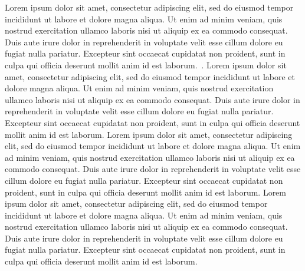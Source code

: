 \documentclass[letterpaper, 10 pt, conference]{ieeeconf}  %
\begin{document}
Lorem ipsum dolor sit amet, consectetur adipiscing elit, sed do eiusmod tempor incididunt ut labore et dolore magna aliqua. Ut enim ad minim veniam, quis nostrud exercitation ullamco laboris nisi ut aliquip ex ea commodo consequat. Duis aute irure dolor in reprehenderit in voluptate velit esse cillum dolore eu fugiat nulla pariatur. Excepteur sint occaecat cupidatat non proident, sunt in culpa qui officia deserunt mollit anim id est laborum.~\cite{Cite16}. Lorem ipsum dolor sit amet, consectetur adipiscing elit, sed do eiusmod tempor incididunt ut labore et dolore magna aliqua. Ut enim ad minim veniam, quis nostrud exercitation ullamco laboris nisi ut aliquip ex ea commodo consequat. Duis aute irure dolor in reprehenderit in voluptate velit esse cillum dolore eu fugiat nulla pariatur. Excepteur sint occaecat cupidatat non proident, sunt in culpa qui officia deserunt mollit anim id est laborum. Lorem ipsum dolor sit amet, consectetur adipiscing elit, sed do eiusmod tempor incididunt ut labore et dolore magna aliqua. Ut enim ad minim veniam, quis nostrud exercitation ullamco laboris nisi ut aliquip ex ea commodo consequat. Duis aute irure dolor in reprehenderit in voluptate velit esse cillum dolore eu fugiat nulla pariatur. Excepteur sint occaecat cupidatat non proident, sunt in culpa qui officia deserunt mollit anim id est laborum. Lorem ipsum dolor sit amet, consectetur adipiscing elit, sed do eiusmod tempor incididunt ut labore et dolore magna aliqua. Ut enim ad minim veniam, quis nostrud exercitation ullamco laboris nisi ut aliquip ex ea commodo consequat. Duis aute irure dolor in reprehenderit in voluptate velit esse cillum dolore eu fugiat nulla pariatur. Excepteur sint occaecat cupidatat non proident, sunt in culpa qui officia deserunt mollit anim id est laborum.

\addtolength{\textheight}{-12cm}   %


{}

\end{document}
